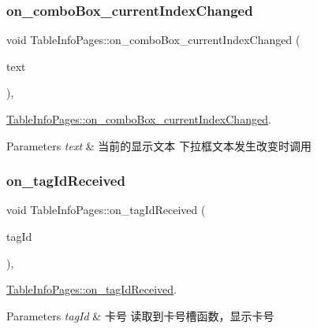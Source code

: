 \subsubsection{\texorpdfstring{on\_comboBox\_currentIndexChanged}{on\_comboBox\_currentIndexChanged}}
{\footnotesize\ttfamily void Table\+Info\+Pages\+::on\+\_\+combo\+Box\+\_\+current\+Index\+Changed (\begin{DoxyParamCaption}\item[{const Q\+String \&}]{text }\end{DoxyParamCaption})\hspace{0.3cm}{\ttfamily [private]}, {\ttfamily [slot]}}



\mbox{\hyperlink{class_table_info_pages_aaa08abbcf7a0c7c76645896a9cdb610e}{Table\+Info\+Pages\+::on\+\_\+combo\+Box\+\_\+current\+Index\+Changed}}. 


\begin{DoxyParams}{Parameters}
{\em text} & 当前的显示文本 下拉框文本发生改变时调用 \\
\hline
\end{DoxyParams}
\mbox{\label{class_table_info_pages_aaa0d74e1218669ec7b10609c82b130d9}} 
\subsubsection{\texorpdfstring{on\_tagIdReceived}{on\_tagIdReceived}}
{\footnotesize\ttfamily void Table\+Info\+Pages\+::on\+\_\+tag\+Id\+Received (\begin{DoxyParamCaption}\item[{Q\+String}]{tag\+Id }\end{DoxyParamCaption})\hspace{0.3cm}{\ttfamily [private]}, {\ttfamily [slot]}}



\mbox{\hyperlink{class_table_info_pages_aaa0d74e1218669ec7b10609c82b130d9}{Table\+Info\+Pages\+::on\+\_\+tag\+Id\+Received}}. 


\begin{DoxyParams}{Parameters}
{\em tag\+Id} & 卡号 读取到卡号槽函数，显示卡号 \\
\hline
\end{DoxyParams}
\mbox{\label{class_table_info_pages_a36dc73fa99cf8cfb6139ff33a1cd9741}} 
